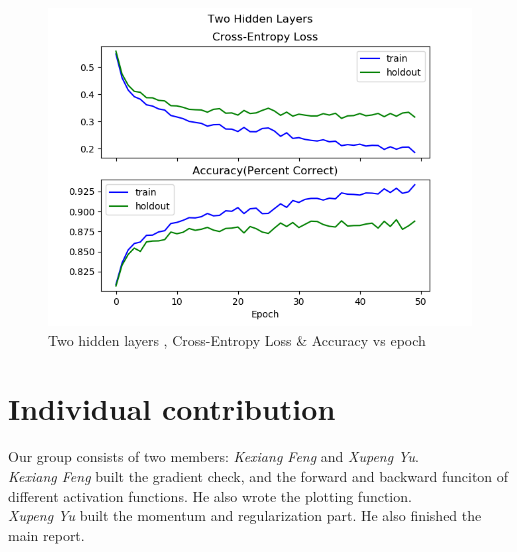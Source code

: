 \documentclass{article} %
\begin{document}
\begin{figure}[h]	
	\centering
	\includegraphics[scale=0.5]{./plots/TwoHiddenLayers.png}
	\caption{Two hidden layers , Cross-Entropy Loss \& Accuracy vs epoch}
\end{figure}
\section{Individual contribution}
Our group consists of two members: \textit{Kexiang Feng} and \textit{Xupeng Yu}. \\
\textit{Kexiang Feng} built the gradient check, and the forward and backward funciton of different activation functions. He also wrote the plotting function.\\
\textit{Xupeng Yu} built the momentum and regularization part. He also finished the main report.
\end{document}
